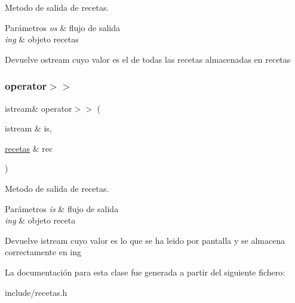 Metodo de salida de recetas. 


\begin{DoxyParams}{Parámetros}
{\em os} & flujo de salida \\
\hline
{\em ing} & objeto recetas \\
\hline
\end{DoxyParams}
\begin{DoxyReturn}{Devuelve}
ostream cuyo valor es el de todas las recetas almacenadas en recetas 
\end{DoxyReturn}
\mbox{\label{classrecetas_ad812452076c1f84b23969bc5983e0977}} 
\subsubsection{\texorpdfstring{operator$>$$>$}{operator>>}}
{\footnotesize\ttfamily istream\& operator$>$$>$ (\begin{DoxyParamCaption}\item[{istream \&}]{is,  }\item[{\hyperlink{classrecetas}{recetas} \&}]{rec }\end{DoxyParamCaption})\hspace{0.3cm}{\ttfamily [friend]}}



Metodo de salida de recetas. 


\begin{DoxyParams}{Parámetros}
{\em is} & flujo de salida \\
\hline
{\em ing} & objeto receta \\
\hline
\end{DoxyParams}
\begin{DoxyReturn}{Devuelve}
istream cuyo valor es lo que se ha leido por pantalla y se almacena correctamente en ing 
\end{DoxyReturn}


La documentación para esta clase fue generada a partir del siguiente fichero\+:\begin{DoxyCompactItemize}
\item 
include/recetas.\+h\end{DoxyCompactItemize}
